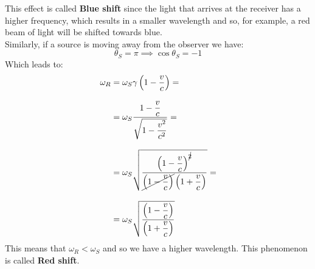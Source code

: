 This effect is called \textbf{Blue shift} since the light that arrives at the receiver has a higher frequency, which results in a smaller wavelength and so, for example, a red beam of light will be shifted towards blue.\\
Similarly, if a source is moving away from the observer we have:
\begin{equation}
  \theta_S = \pi \implies \cos \theta_S = -1
\end{equation}
Which leads to:
\begin{equation}
  \begin{split}
    \omega_R  &= \omega_S \gamma\left(1 - \dfrac{v}{c}\right) = \\[8pt]
    &= \omega_S \dfrac{1 - \dfrac{v}{c}}{\sqrt{1 - \dfrac{v^2}{c^2}}} = \\[8pt]
    &= \omega_S \sqrt{\dfrac{\left(1 - \dfrac{v}{c}\right)^{\cancel{2}}}{\cancel{\left(1 - \dfrac{v}{c}\right)}\left(1 + \dfrac{v}{c}\right)}} = \\[8pt]
    &= \omega_S \sqrt{\dfrac{\left(1 - \dfrac{v}{c}\right)}{\left(1 + \dfrac{v}{c}\right)}}
  \end{split}
\end{equation}
This means that $\omega_R < \omega_S$ and so we have a higher wavelength. This phenomenon is called \textbf{Red shift}.
